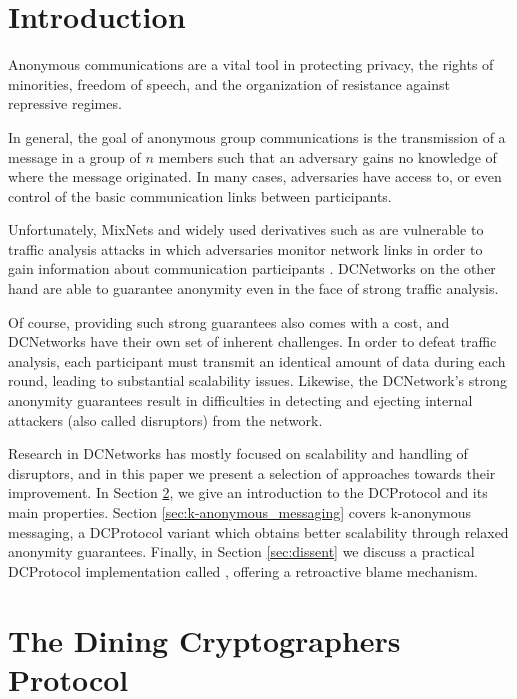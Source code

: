 \section{Introduction}

Anonymous communications are a vital tool in protecting privacy, the rights of minorities,
freedom of speech, and the organization of resistance against repressive regimes.

In general, the goal of anonymous group communications is the transmission of a message
in a group of $n$ members such that an adversary gains no knowledge of where the message originated.
In many cases, adversaries have access to, or even control of the basic communication
links between participants.

Unfortunately, \acp{MixNet} \cite{journals/cacm/Chaum81} and
widely used derivatives such as \Tor \cite{conf/uss/DingledineMS04} are vulnerable to traffic
analysis attacks in which adversaries monitor network links in order to gain information
about communication participants \cite{murdoch2005low}. \acp{DCNetwork} on the other hand
are able to guarantee anonymity even in the face of strong traffic analysis.

Of course, providing such strong guarantees also comes with a cost, and \acp{DCNetwork}
have their own set of inherent challenges. In order to defeat traffic analysis,
each participant must transmit an identical amount of data during each round,
leading to substantial scalability issues. Likewise, the \ac{DCNetwork}'s strong anonymity guarantees result
in difficulties in detecting and ejecting internal attackers (also called disruptors) from the network.

Research in \acp{DCNetwork} has mostly focused on scalability and handling of disruptors,
and in this paper we present a selection of approaches towards their improvement.
In Section \ref{sec:dining_cryptographers_protocol}, we give an introduction
to the \ac{DCProtocol} and its main properties. Section \ref{sec:k-anonymous_messaging} 
covers k-anonymous messaging, a \ac{DCProtocol} variant which obtains better scalability
through relaxed anonymity guarantees. Finally, in Section \ref{sec:dissent} we discuss a practical
\ac{DCProtocol} implementation called \Dissent, offering a retroactive blame mechanism.

\section{The Dining Cryptographers Protocol} \label{sec:dining_cryptographers_protocol}

